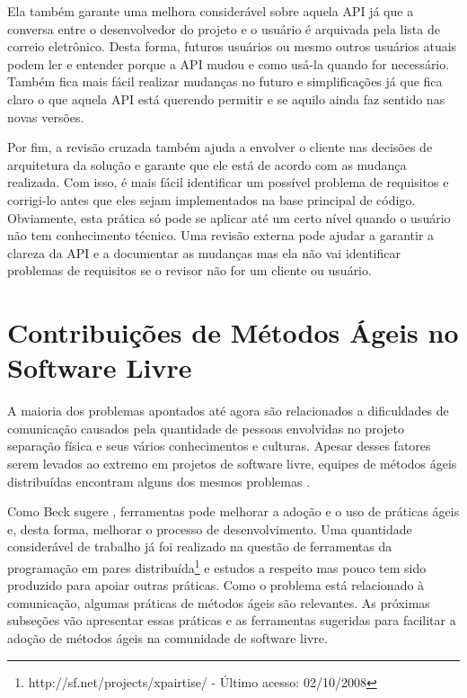 Ela também garante uma melhora considerável sobre aquela API já que a
conversa entre o desenvolvedor do projeto e o usuário é arquivada pela
lista de correio eletrônico. Desta forma, futuros usuários ou mesmo
outros usuários atuais podem ler e entender porque a API mudou e como
usá-la quando for necessário. Também fica mais fácil realizar mudanças
no futuro e simplificações já que fica claro o que aquela API está
querendo permitir e se aquilo ainda faz sentido nas novas versões.

Por fim, a revisão cruzada também ajuda a envolver o cliente nas
decisões de arquitetura da solução e garante que ele está de acordo
com as mudança realizada. Com isso, é mais fácil identificar um
possível problema de requisitos e corrigi-lo antes que eles sejam
implementados na base principal de código. Obviamente, esta prática só
pode se aplicar até um certo nível quando o usuário não tem
conhecimento técnico. Uma revisão externa pode ajudar a garantir a
clareza da API e a documentar as mudanças mas ela não vai identificar
problemas de requisitos se o revisor não for um cliente ou usuário.

\section{Contribuições de Métodos Ágeis no Software Livre}
\label{sec:agile-improve-os}

A maioria dos problemas apontados até agora são relacionados a
dificuldades de comunicação causados pela quantidade de pessoas
envolvidas no projeto separação física e seus vários conhecimentos e
culturas. Apesar desses fatores serem levados ao extremo em projetos
de software livre, equipes de métodos ágeis distribuídas encontram
alguns dos mesmos problemas \cite{Sutherland2007,Maurer2002}.

Como Beck sugere \cite{Beck2008}, ferramentas pode melhorar a adoção e
o uso de práticas ágeis e, desta forma, melhorar o processo de
desenvolvimento. Uma quantidade considerável de trabalho já foi
realizado na questão de ferramentas da programação em pares
distribuída\footnote{http://sf.net/projects/xpairtise/ - Último
  acesso: 02/10/2008} e estudos a respeito \cite{Nagappan2003} mas
pouco tem sido produzido para apoiar outras práticas. Como o problema
está relacionado à comunicação, algumas práticas de métodos ágeis são
relevantes. As próximas subseções vão apresentar essas práticas e as
ferramentas sugeridas para facilitar a adoção de métodos ágeis na
comunidade de software livre.

